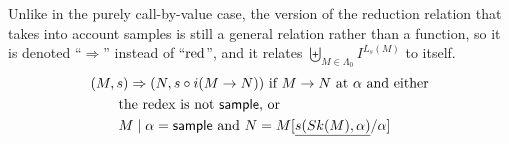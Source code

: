 Unlike in the purely call-by-value case, the version of the reduction relation that takes into account samples is still a general relation rather than a function, so it is denoted ``$\Rightarrow$'' instead of ``$\operatorname{red}$'', and it relates $\biguplus_{M \in \Lambda_0} I^{L_s(M)}$ to itself.
\begin{align*}
& (M,s) \Rightarrow (N,s \circ i(M \to N)) \text{ if $M \to N$ at $\alpha$ and either} \\
& \qquad \text{the redex is not $\mathsf{sample}$, or} \\
& \qquad \text{$M \mid \alpha = \mathsf{sample}$ and $N = M[\underline{s(Sk(M),\alpha)}/\alpha]$}
\end{align*}

